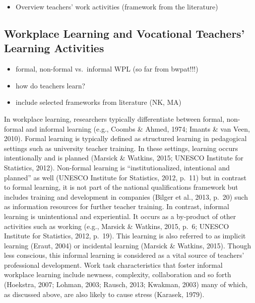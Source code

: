 \documentclass[
]{article}
\providecommand{\tightlist}{%
  \setlength{\itemsep}{0pt}\setlength{\parskip}{0pt}}
\begin{document}
\begin{itemize}
\tightlist
\item
  Overview teachers' work activities (framework from the literature)
\end{itemize}

\subsection{Workplace Learning and Vocational Teachers' Learning
Activities}\label{workplace-learning-and-vocational-teachers-learning-activities}

\begin{itemize}
\tightlist
\item
  formal, non-formal vs.~informal WPL (so far from bwpat!!!)
\item
  how do teachers learn?
\item
  include selected frameworks from literature (NK, MA)
\end{itemize}

In workplace learning, researchers typically differentiate between
formal, non-formal and informal learning (e.g., Coombs \& Ahmed, 1974;
Imants \& van Veen, 2010). Formal learning is typically defined as
structured learning in pedagogical settings such as university teacher
training. In these settings, learning occurs intentionally and is
planned (Marsick \& Watkins, 2015; UNESCO Institute for Statistics,
2012). Non-formal learning is ``institutionalized, intentional and
planned'' as well (UNESCO Institute for Statistics, 2012, p.~11) but in
contrast to formal learning, it is not part of the national
qualifications framework but includes training and development in
companies (Bilger et al., 2013, p.~20) such as information resources for
further teacher training. In contrast, informal learning is
unintentional and experiential. It occurs as a by-product of other
activities such as working (e.g., Marsick \& Watkins, 2015, p.~6; UNESCO
Institute for Statistics, 2012, p.~19). This learning is also referred
to as implicit learning (Eraut, 2004) or incidental learning (Marsick \&
Watkins, 2015). Though less conscious, this informal learning is
considered as a vital source of teachers' professional development. Work
task characteristics that foster informal workplace learning include
newness, complexity, collaboration and so forth (Hoekstra, 2007; Lohman,
2003; Rausch, 2013; Kwakman, 2003) many of which, as discussed above,
are also likely to cause stress (Karasek, 1979).
\end{document}
